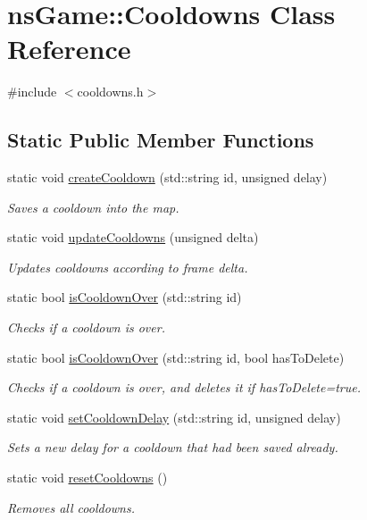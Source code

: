 \hypertarget{classns_game_1_1_cooldowns}{}\section{ns\+Game\+:\+:Cooldowns Class Reference}
\label{classns_game_1_1_cooldowns}


{\ttfamily \#include $<$cooldowns.\+h$>$}

\subsection*{Static Public Member Functions}
\begin{DoxyCompactItemize}
\item 
static void \hyperlink{classns_game_1_1_cooldowns_a70e8df0692a58a08b31b2b6c9578265e}{create\+Cooldown} (std\+::string id, unsigned delay)
\begin{DoxyCompactList}\small\item\em Saves a cooldown into the map. \end{DoxyCompactList}\item 
static void \hyperlink{classns_game_1_1_cooldowns_a35012d31be60c3743363d0487f2cead9}{update\+Cooldowns} (unsigned delta)
\begin{DoxyCompactList}\small\item\em Updates cooldowns according to frame delta. \end{DoxyCompactList}\item 
static bool \hyperlink{classns_game_1_1_cooldowns_a423a58fcbbf7688556c5706249365f12}{is\+Cooldown\+Over} (std\+::string id)
\begin{DoxyCompactList}\small\item\em Checks if a cooldown is over. \end{DoxyCompactList}\item 
static bool \hyperlink{classns_game_1_1_cooldowns_ace34dc5863d0cf6aa01120832b382cd2}{is\+Cooldown\+Over} (std\+::string id, bool has\+To\+Delete)
\begin{DoxyCompactList}\small\item\em Checks if a cooldown is over, and deletes it if has\+To\+Delete=true. \end{DoxyCompactList}\item 
static void \hyperlink{classns_game_1_1_cooldowns_a0db5b81efac93aacc0b12b2aa520620b}{set\+Cooldown\+Delay} (std\+::string id, unsigned delay)
\begin{DoxyCompactList}\small\item\em Sets a new delay for a cooldown that had been saved already. \end{DoxyCompactList}\item 
static void \hyperlink{classns_game_1_1_cooldowns_a820c7d29780f60b9f5ac5440e134de2e}{reset\+Cooldowns} ()
\begin{DoxyCompactList}\small\item\em Removes all cooldowns. \end{DoxyCompactList}\end{DoxyCompactItemize}



